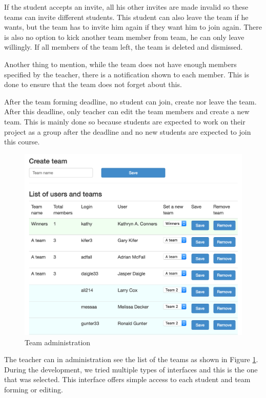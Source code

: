 If the student accepts an invite, all his other invites are made invalid so these teams can invite different students. This student can also leave the team if he wants, but the team has to invite him again if they want him to join again. There is also no option to kick another team member from team, he can only leave willingly. If all members of the team left, the team is deleted and dismissed.

Another thing to mention, while the team does not have enough members specified by the teacher, there is a notification shown to each member. This is done to ensure that the team does not forget about this.

After the team forming deadline, no student can join, create nor leave the team. After this deadline, only teacher can edit the team members and create a new team. This is mainly done so because students are expected to work on their project as a group after the deadline and no new students are expected to join this course.

\begin{figure}[h]
    \centering
    \includegraphics[width=\textwidth]{images/teamadmin.png}
    \caption{Team administration}
    \label{team_forming}
\end{figure}

The teacher can in administration see the list of the teams as shown in Figure \ref{team_forming}. During the development, we tried multiple types of interfaces and this is the one that was selected. This interface offers simple access to each student and team forming or editing.

